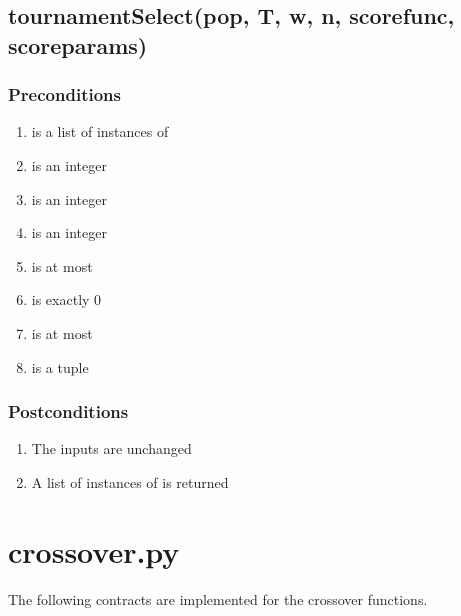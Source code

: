 \documentclass[letterpaper,10pt,english]{sphinxmanual}
\begin{document}
\subsection{tournamentSelect(pop, T, w, n, scorefunc, scoreparams)}
\label{contracts:tournamentselect-pop-t-w-n-scorefunc-scoreparams}

\subsubsection{Preconditions}
\label{contracts:id33}\begin{enumerate}
\item {} 
 is a list of instances of 

\item {} 
 is an integer

\item {} 
 is an integer

\item {} 
 is an integer

\item {} 
 is at most 

\item {} 
 is exactly 0

\item {} 
 is at most 

\item {} 
 is a tuple

\end{enumerate}


\subsubsection{Postconditions}
\label{contracts:id34}\begin{enumerate}
\item {} 
The inputs are unchanged

\item {} 
A list of  instances of  is returned

\end{enumerate}


\section{crossover.py}
\label{contracts:crossover-py}
The following contracts are implemented for the crossover functions.
\end{document}
